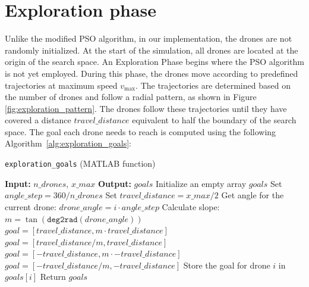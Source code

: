 \section{Exploration phase}
\par Unlike the modified PSO algorithm, in our implementation, the drones are not randomly initialized. 
At the start of the simulation, all drones are located at the origin of the search space. 
An Exploration Phase begins where the PSO algorithm is not yet employed. 
During this phase, the drones move according to predefined trajectories at maximum speed $v_{\text{max}}$. 
The trajectories are determined based on the number of drones and follow a radial pattern, as shown in Figure \ref{fig:exploration_pattern}. 
The drones follow these trajectories until they have covered a distance $travel\_distance$ equivalent to half the boundary of the search space.
The goal each drone needs to reach is computed using the following Algorithm~\ref{alg:exploration_goals}:

\begin{algorithm}[H]
    \caption{\texttt{exploration\_goals} (MATLAB function)} \label{alg:exploration_goals}
    \begin{algorithmic}[1]
        \State \textbf{Input:} $n\_{drones}$, $x\_{max}$
        \State \textbf{Output:} $goals$ 
        \State Initialize an empty array $goals$
        \State Set $angle\_step = 360 / n\_{drones}$
        \State Set $travel\_distance = x\_{max} / 2$ 
            \State Get angle for the current drone: $drone\_angle = i \cdot angle\_step$
            \State Calculate slope: $m = \tan(\texttt{deg2rad}(drone\_angle))$
                \State $goal = [travel\_distance, m \cdot travel\_distance]$ 
                \State $goal = [travel\_distance / m, travel\_distance]$ 
                \State $goal = [-travel\_distance, m \cdot -travel\_distance]$ 
                \State $goal = [-travel\_distance / m, -travel\_distance]$ 
            \EndIf
            \State Store the goal for drone $i$ in $goals[i]$
        \EndFor
        \State Return $goals$
    \end{algorithmic}
\end{algorithm}

